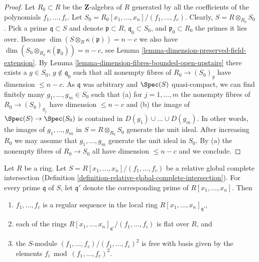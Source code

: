 \begin{proof}
Let $R_0 \subset R$ be the $\mathbf{Z}$-algebra of $R$ generated by all the
coefficients of the polynomials $f_1, \ldots, f_c$. Let
$S_0 = R_0[x_1, \ldots, x_n]/(f_1, \ldots, f_c)$.
Clearly, $S = R \otimes_{R_0} S_0$.
Pick a prime $\mathfrak q \subset S$ and denote
$\mathfrak p \subset R$, $\mathfrak q_0 \subset S_0$, and
$\mathfrak p_0 \subset R_0$ the primes it lies over.
Because $\dim (S \otimes_R \kappa(\mathfrak p) ) = n - c$
we also have $\dim (S_0 \otimes_{R_0} \kappa(\mathfrak p_0)) = n - c$,
see Lemma \ref{lemma-dimension-preserved-field-extension}.
By Lemma \ref{lemma-dimension-fibres-bounded-open-upstairs}
there exists a $g \in S_0$, $g \not \in \mathfrak q_0$
such that all nonempty fibres of $R_0 \to (S_0)_g$
have dimension $\leq n - c$. As $\mathfrak q$ was arbitrary and
$\Spec(S)$ quasi-compact, we can find finitely many
$g_1, \ldots, g_m \in S_0$ such that (a) for $j = 1, \ldots, m$
the nonempty fibres of
$R_0 \to (S_0)_{g_j}$ have dimension $\leq n - c$ and (b) the image of
$\Spec(S) \to \Spec(S_0)$ is contained in $D(g_1) \cup \ldots \cup D(g_m)$.
In other words, the images of $g_1, \ldots, g_m$ in $S = R \otimes_{R_0} S_0$
generate the unit ideal. After increasing $R_0$ we may assume
that $g_1, \ldots, g_m$ generate the unit ideal in $S_0$. By (a)
the nonempty fibres of $R_0 \to S_0$ all have dimension $\leq n - c$
and we conclude.
\end{proof}

\begin{lemma}
\label{lemma-relative-global-complete-intersection-conormal}
Let $R$ be a ring. Let $S = R[x_1, \ldots, x_n]/(f_1, \ldots, f_c)$
be a relative global complete intersection (Definition
\ref{definition-relative-global-complete-intersection}). For every prime
$\mathfrak q$ of $S$, let $\mathfrak q'$ denote the corresponding
prime of $R[x_1, \ldots, x_n]$. Then
\begin{enumerate}
\item $f_1, \ldots, f_c$ is a regular sequence in the local ring
$R[x_1, \ldots, x_n]_{\mathfrak q'}$,
\item each of the rings
$R[x_1, \ldots, x_n]_{\mathfrak q'}/(f_1, \ldots, f_i)$ is flat over $R$, and
\item the $S$-module $(f_1, \ldots, f_c)/(f_1, \ldots, f_c)^2$
is free with basis given by the elements $f_i \bmod (f_1, \ldots, f_c)^2$.
\end{enumerate}
\end{lemma}

